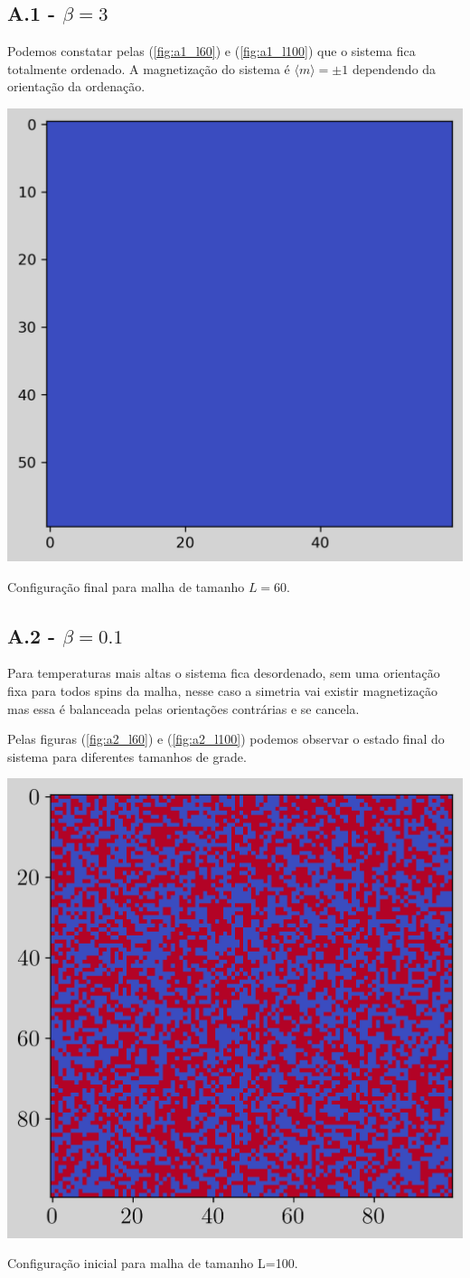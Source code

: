 \subsection{A.1 - $\beta = 3$}
Podemos constatar pelas (\ref{fig:a1_l60}) e (\ref{fig:a1_l100}) que o sistema fica totalmente ordenado. 
A magnetização do sistema é $\langle m \rangle = \pm 1$ dependendo da orientação da ordenação. 


\begin{marginfigure}
    \centering
    \includegraphics[width=0.6\linewidth]{graficos/tarefa-1/graf-tarefa-A1-conf-L60.png}
    \caption{Configuração final para malha de tamanho $L=60$.}
    \label{fig:a1_l60}
\end{marginfigure}
\subsection{A.2 - $\beta = 0.1$}
Para temperaturas mais altas o sistema fica desordenado, sem uma orientação fixa para
todos spins da malha, nesse caso a simetria vai existir magnetização mas essa é balanceada
pelas orientações contrárias e se cancela. 

Pelas figuras (\ref{fig:a2_l60}) e (\ref{fig:a2_l100}) podemos observar o estado final 
do sistema para diferentes tamanhos de grade.

\begin{marginfigure}[h!]
    \centering
    \includegraphics[width=0.7\linewidth]{graficos/tarefa-1/graf-tarefa-A2-conf-L100.png}
    \caption{Configuração inicial para malha de tamanho L=100.}
\end{marginfigure}
